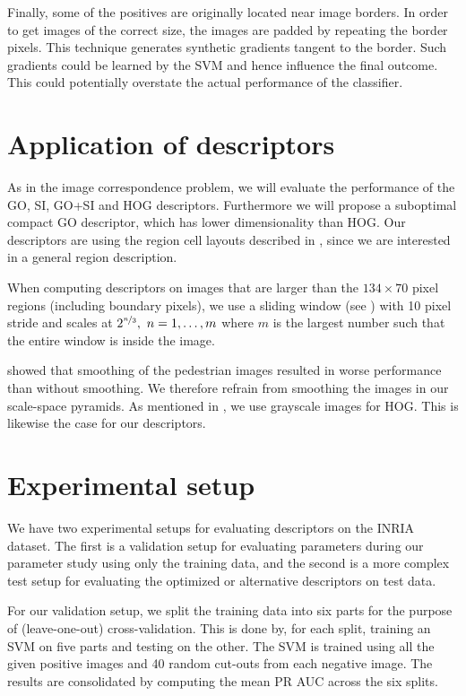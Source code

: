 \documentclass[thesis.tex]{subfiles}
\begin{document}
Finally, some of the positives are originally located near image borders. In order to get images of the correct size, the images are padded by repeating the border pixels. This technique generates synthetic gradients tangent to the border. Such gradients could be learned by the SVM and hence influence the final outcome. This could potentially overstate the actual performance of the classifier.
%
\section{Application of descriptors}
\label{sec:inriaDescriptorApplication}
%
As in the image correspondence problem, we will evaluate the performance of the GO, SI, GO+SI and HOG descriptors. Furthermore we will propose a suboptimal compact GO descriptor, which has lower dimensionality than HOG.
Our descriptors are using the region cell layouts described in , since we are interested in a general region description.

When computing descriptors on images that are larger than the $134 \times 70$ pixel regions (including boundary pixels), we use a sliding window (see ) with 10 pixel stride and scales at $2^{\nicefrac{n}{3}},~n=1,\hdots,m$ where $m$ is the largest number such that the entire window is inside the image. 

\citet{dalal2005histograms} showed that smoothing of the pedestrian images resulted in worse performance than without smoothing. We therefore refrain from smoothing the images in our scale-space pyramids. As mentioned in , we use grayscale images for HOG. This is likewise the case for our descriptors.
%
\section{Experimental setup}
\label{sec:inriaExperimentalSetup}
%
We have two experimental setups for evaluating descriptors on the INRIA dataset. The first is a validation setup for evaluating parameters during our parameter study using only the training data, and the second is a more complex test setup for evaluating the optimized or alternative descriptors on test data.

For our validation setup, we split the training data into six parts for the purpose of (leave-one-out) cross-validation. This is done by, for each split, training an SVM on five parts and testing on the other. The SVM is trained using all the given positive images and 40 random cut-outs from each negative image. The results are consolidated by computing the mean PR AUC across the six splits.
\end{document}
